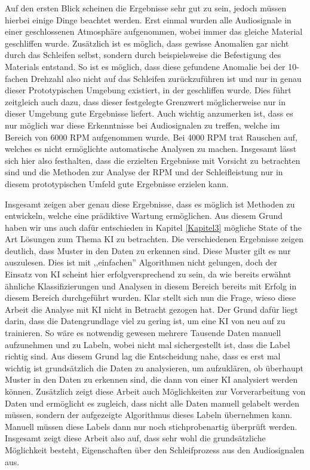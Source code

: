 Auf den ersten Blick scheinen die Ergebnisse sehr gut zu sein, jedoch müssen hierbei einige Dinge beachtet werden. Erst einmal wurden alle Audiosignale in einer geschlossenen Atmosphäre aufgenommen, wobei immer das gleiche Material geschliffen wurde. Zusätzlich ist es möglich, dass gewisse Anomalien gar nicht durch das Schleifen selbst, sondern durch beispielsweise die Befestigung des Materials entstand. So ist es möglich, dass diese gefundene Anomalie bei der 10-fachen Drehzahl also nicht auf das Schleifen zurückzuführen ist und nur in genau dieser Prototypischen Umgebung existiert, in der geschliffen wurde. Dies führt zeitgleich auch dazu, dass dieser festgelegte Grenzwert möglicherweise nur in dieser Umgebung gute Ergebnisse liefert. Auch wichtig anzumerken ist, dass es nur möglich war diese Erkenntnisse bei Audiosignalen zu treffen, welche im Bereich von 6000 RPM aufgenommen wurde. Bei 4000 RPM trat Rauschen auf, welches es nicht ermöglichte automatische Analysen zu machen. Insgesamt lässt sich hier also festhalten, dass die erzielten Ergebnisse mit Vorsicht zu betrachten sind und die Methoden zur Analyse der RPM und der Schleifleistung nur in diesem prototypischen Umfeld gute Ergebnisse erzielen kann.

Insgesamt zeigen aber genau diese Ergebnisse, dass es möglich ist Methoden zu entwickeln, welche eine prädiktive Wartung ermöglichen. Aus diesem Grund haben wir uns auch dafür entschieden in Kapitel \ref{Kapitel3} mögliche State of the Art Lösungen zum Thema KI zu betrachten. Die verschiedenen Ergebnisse zeigen deutlich, dass Muster in den Daten zu erkennen sind. Diese Muster gilt es nur auszulesen. Dies ist mit ,,einfachen'' Algorithmen nicht gelungen, doch der Einsatz von KI scheint hier erfolgversprechend zu sein, da wie bereits erwähnt ähnliche Klassifizierungen und Analysen in diesem Bereich bereits mit Erfolg in diesem Bereich durchgeführt wurden. Klar stellt sich nun die Frage, wieso diese Arbeit die Analyse mit KI nicht in Betracht gezogen hat. Der Grund dafür liegt darin, dass die Datengrundlage viel zu gering ist, um eine KI von neu auf zu trainieren. So wäre es notwendig gewesen mehrere Tausende Daten manuell aufzunehmen und zu Labeln, wobei nicht mal sichergestellt ist, dass die Label richtig sind. Aus diesem Grund lag die Entscheidung nahe, dass es erst mal wichtig ist grundsätzlich die Daten zu analysieren, um aufzuklären, ob überhaupt Muster in den Daten zu erkennen sind, die dann von einer KI analysiert werden können. Zusätzlich zeigt diese Arbeit auch Möglichkeiten zur Vorverarbeitung von Daten und ermöglicht es zugleich, dass nicht alle Daten manuell gelabelt werden müssen, sondern der aufgezeigte Algorithmus dieses Labeln übernehmen kann. Manuell müssen diese Labels dann nur noch stichprobenartig überprüft werden. Insgesamt zeigt diese Arbeit also auf, dass sehr wohl die grundsätzliche Möglichkeit besteht, Eigenschaften über den Schleifprozess aus den Audiosignalen aus.


\endinput
